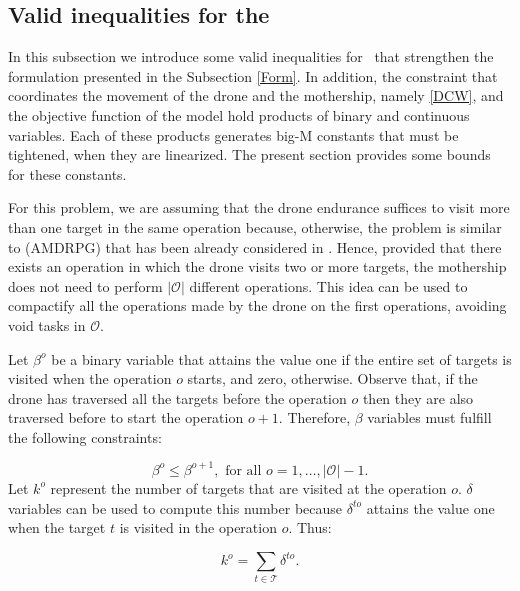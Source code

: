


\subsection{Valid inequalities for the \AMD} 

In this subsection we introduce some valid inequalities for \AMD \ that strengthen the formulation presented in the Subsection \ref{Form}. In addition, the constraint that coordinates the movement of the drone and the mothership, namely \eqref{DCW}, and the objective function of the model hold products of binary and continuous variables. Each of these products generates big-M constants that must be tightened, when they are linearized. The present section provides some bounds for these constants.

For this problem, we are assuming that the drone  endurance suffices to visit more than one target in the same operation because, otherwise, the problem is similar to (AMDRPG) that has  been already considered in \cite{art:Amorosi2021}. Hence, provided that there exists an operation in which the drone visits two or more targets, the mothership does not need to perform $|\mathcal O|$ different operations. This idea can be used to compactify all the operations made by the drone on the first operations, avoiding void tasks in $\mathcal O$.
\noindent

Let $\beta^o$ be a binary variable that attains the value one if the entire set of targets is visited when the operation $o$ starts, and zero, otherwise. Observe that, if the drone has traversed all the targets before the operation $o$ then they are also traversed before to start the operation $o+1$. Therefore, $\beta$ variables must fulfill the following constraints:

\begin{equation}\tag{Monotonicity}\label{eq:Monotonicity}
\beta^{o} \leq \beta^{o+1}, \mbox{ for all } o=1,\ldots, |\mathcal{O}|-1.
\end{equation}
Let $k^o$ represent the number of targets that are visited at the operation $o$. $\delta$ variables can be used to compute this number because $\delta^{to}$ attains the value one when the target $t$ is visited in the operation $o$. Thus:

$$k^o=\sum_{t\in\mathcal T} \delta^{to}.$$


